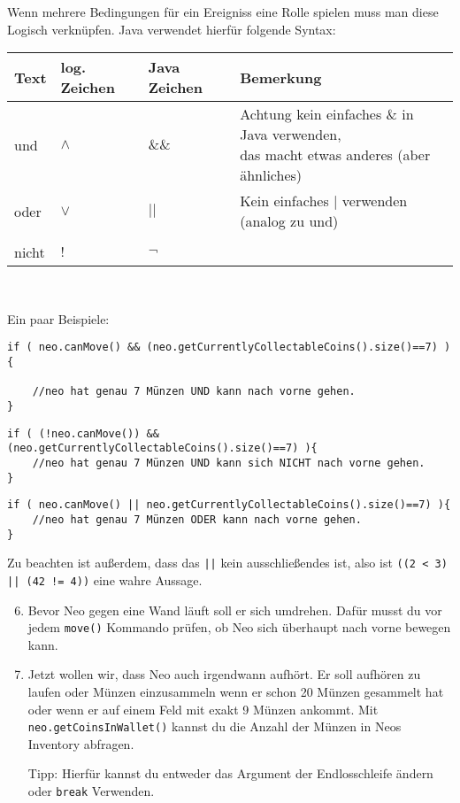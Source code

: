 \begin{Infobox}

	Wenn mehrere Bedingungen für ein Ereigniss eine Rolle spielen muss man diese Logisch verknüpfen. 
	Java verwendet hierfür folgende Syntax:
	\begin{center}
		\begin{tabular}{ l | l | l | l}
			Text & log. Zeichen & Java Zeichen & Bemerkung \\ \hline
			und  & $\land$ & $\&\&$ & \minibox{
					Achtung kein einfaches \& in Java verwenden,\\ 
					das macht etwas anderes (aber ähnliches)
			} \\
			oder & $\lor$ & $||$ & Kein einfaches $|$ verwenden (analog zu und) \\
			& &  \\
			nicht & $!$ & $\neg$ &\\
		\end{tabular}\\
	\end{center}

	Ein paar Beispiele:

	\begin{lstlisting}[numbers=none]
if ( neo.canMove() && (neo.getCurrentlyCollectableCoins().size()==7) ){

	//neo hat genau 7 Münzen UND kann nach vorne gehen.
}
	\end{lstlisting}

	\begin{lstlisting}[numbers=none]
if ( (!neo.canMove()) && (neo.getCurrentlyCollectableCoins().size()==7) ){
	//neo hat genau 7 Münzen UND kann sich NICHT nach vorne gehen.
}
	\end{lstlisting}

	\begin{lstlisting}[numbers=none]
if ( neo.canMove() || neo.getCurrentlyCollectableCoins().size()==7) ){
	//neo hat genau 7 Münzen ODER kann nach vorne gehen.
}
	\end{lstlisting}

	Zu beachten ist außerdem, dass das  \lstinline{||} kein ausschließendes  ist, also ist \lstinline{((2 < 3) || (42 != 4))} eine wahre Aussage.

\end{Infobox}


\begin{enumerate}\setcounter{enumi}{5}
	\item
		Bevor Neo gegen eine Wand läuft soll er sich umdrehen.
		Dafür musst du vor jedem \lstinline{move()} Kommando prüfen, ob Neo sich überhaupt nach vorne bewegen kann.

	\item
		Jetzt wollen wir, dass Neo auch irgendwann aufhört.
		Er soll aufhören zu laufen oder Münzen einzusammeln wenn er schon 20 Münzen gesammelt hat oder wenn er auf einem Feld mit exakt 9 Münzen ankommt.
		Mit \lstinline{neo.getCoinsInWallet()} kannst du die Anzahl der Münzen in Neos Inventory abfragen.

		Tipp: Hierfür kannst du entweder das Argument der Endlosschleife ändern oder \lstinline{break} Verwenden.
\end{enumerate}
\newpage

